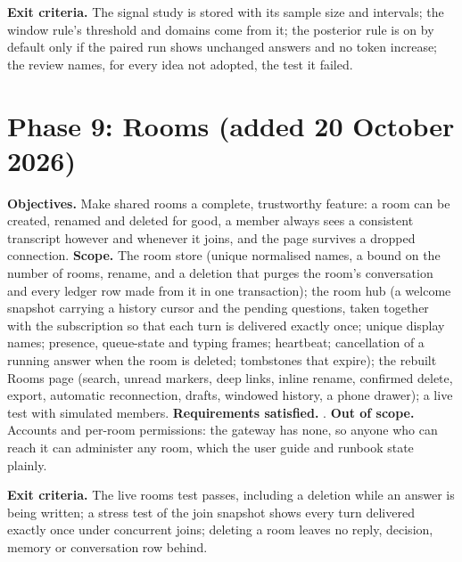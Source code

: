 \documentclass[11pt,a4paper]{article}
\begin{document}
\textbf{Exit criteria.} The signal study is stored with its sample size and intervals; the window rule's threshold and domains come from it; the posterior rule is on by default only if the paired run shows unchanged answers and no token increase; the review names, for every idea not adopted, the test it failed.

\section{Phase 9: Rooms (added 20 October 2026)}
\textbf{Objectives.} Make shared rooms a complete, trustworthy feature: a room can be created, renamed and deleted for good, a member always sees a consistent transcript however and whenever it joins, and the page survives a dropped connection. \textbf{Scope.} The room store (unique normalised names, a bound on the number of rooms, rename, and a deletion that purges the room's conversation and every ledger row made from it in one transaction); the room hub (a welcome snapshot carrying a history cursor and the pending questions, taken together with the subscription so that each turn is delivered exactly once; unique display names; presence, queue-state and typing frames; heartbeat; cancellation of a running answer when the room is deleted; tombstones that expire); the rebuilt Rooms page (search, unread markers, deep links, inline rename, confirmed delete, export, automatic reconnection, drafts, windowed history, a phone drawer); a live test with simulated members. \textbf{Requirements satisfied.} \ReqsPhaseJ. \textbf{Out of scope.} Accounts and per-room permissions: the gateway has none, so anyone who can reach it can administer any room, which the user guide and runbook state plainly.

\textbf{Exit criteria.} The live rooms test passes, including a deletion while an answer is being written; a stress test of the join snapshot shows every turn delivered exactly once under concurrent joins; deleting a room leaves no reply, decision, memory or conversation row behind.
\end{document}
